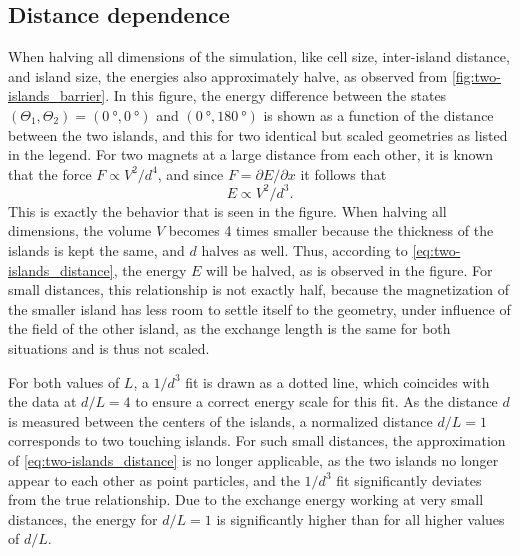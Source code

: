 \documentclass[11pt,a4paper,english,twoside]{article}
\begin{document}
\subsection{Distance dependence}
\label{par:TwoIslands_EnergyHeight}
When halving all dimensions of the simulation, like cell size, inter-island distance, and island size, the energies also approximately halve, as observed from \cref{fig:two-islands_barrier}. In this figure, the energy difference between the states $(\Theta_1, \Theta_2) = (\SI{0}{\degree}, \SI{0}{\degree})$ and $(\SI{0}{\degree}, \SI{180}{\degree})$ is shown as a function of the distance between the two islands, and this for two identical but scaled geometries as listed in the legend. For two magnets at a large distance from each other, it is known~\cite{MagnetForceDistance} that the force $F \propto V^2 / d^4$, and since $F=\partial E/\partial x$ it follows that
\begin{equation}
    E \propto V^2 / d^3 \mathrm{.}
    \label{eq:two-islands_distance}
\end{equation}
This is exactly the behavior that is seen in the figure. When halving all dimensions, the volume $V$ becomes 4 times smaller because the thickness of the islands is kept the same, and $d$ halves as well. Thus, according to \cref{eq:two-islands_distance}, the energy $E$ will be halved, as is observed in the figure. For small distances, this relationship is not exactly half, because the magnetization of the smaller island has less room to settle itself to the geometry, under influence of the field of the other island, as the exchange length is the same for both situations and is thus not scaled. \par
For both values of $L$, a $1/d^3$ fit is drawn as a dotted line, which coincides with the data at $d/L=4$ to ensure a correct energy scale for this fit. As the distance $d$ is measured between the centers of the islands, a normalized distance $d/L=1$ corresponds to two touching islands. For such small distances, the approximation of \cref{eq:two-islands_distance} is no longer applicable, as the two islands no longer appear to each other as point particles, and the $1/d^3$ fit significantly deviates from the true relationship. Due to the exchange energy working at very small distances, the energy for $d/L=1$ is significantly higher than for all higher values of $d/L$.
\end{document}
